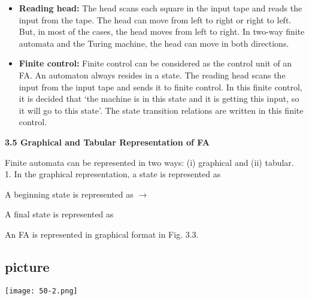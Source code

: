 \documentclass[8pt]{beamer}
\begin{document}
\begin{frame}
\begin{itemize}
  \item \textbf{Reading head:} The head scans each square in the input tape and reads the input from the tape.
The head can move from left to right or right to left. But, in most of the cases, the head moves
from left to right. In two-way finite automata and the Turing machine, the head can move in both
directions.\\
  \item \textbf{Finite control:} Finite control can be considered as the control unit of an FA. An automaton always
resides in a state. The reading head scans the input from the input tape and sends it to finite control.
In this finite control, it is decided that ‘the machine is in this state and it is getting this input, so it
will go to this state’. The state transition relations are written in this finite control.\\
\end{itemize}

\large{
\textbf{3.5 Graphical and Tabular Representation of FA}\\
}
\vspace*{0.2cm}

Finite automata can be represented in two ways: (i) graphical and (ii) tabular.\\

1. In the graphical representation, a state is represented as

\hspace*{0.4cm} A beginning state is represented as $\rightarrow$

\end{frame}

\begin{frame}
\hspace*{0.4cm} A final state is represented as

\vspace*{0.2cm}
\hspace*{0.4cm} An FA is represented in graphical format in Fig. 3.3.\\

\begin{center}
\section{picture}
\texttt{[image: 50-2.png]}
\end{center}
\end{frame}
\end{document}
